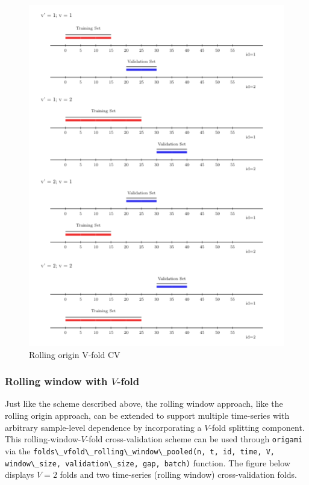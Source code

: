 \documentclass[
  12pt, krantz2,
]{krantz}
\newcommand{\passthrough}[1]{#1}
\newcommand{\1}{\mathbbm{1}}
\theoremstyle{definition}
\theoremstyle{definition}
\theoremstyle{definition}
\theoremstyle{definition}
\theoremstyle{remark}
\begin{document}
\begin{figure}

{\centering \includegraphics[width=0.8\linewidth]{img/png/rolling_origin_v_fold} 

}

\caption{Rolling origin V-fold CV}\label{fig:unnamed-chunk-3}
\end{figure}

\hypertarget{rolling-window-with-v-fold}{%
\subsubsection{\texorpdfstring{Rolling window with \(V\)-fold}{Rolling window with V-fold}}\label{rolling-window-with-v-fold}}

Just like the scheme described above, the rolling window approach, like the
rolling origin approach, can be extended to support multiple time-series with
arbitrary sample-level dependence by incorporating a \(V\)-fold splitting
component. This rolling-window-\(V\)-fold cross-validation scheme can be used
through \passthrough{\lstinline!origami!} via the \passthrough{\lstinline!folds\_vfold\_rolling\_window\_pooled(n, t, id, time, V, window\_size, validation\_size, gap, batch)!} function. The figure below displays
\(V=2\) folds and two time-series (rolling window) cross-validation folds.
\end{document}
